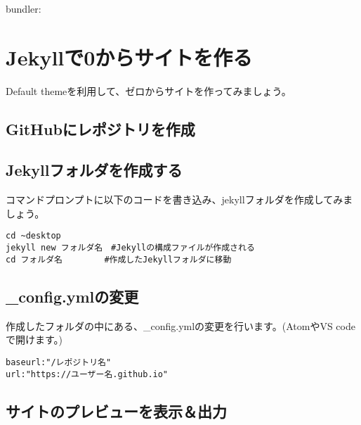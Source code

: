 \documentclass[
]{book}
\begin{document}
bundler:

\hypertarget{jekyllux30670ux304bux3089ux30b5ux30a4ux30c8ux3092ux4f5cux308b}{%
\chapter{Jekyllで0からサイトを作る}\label{jekyllux30670ux304bux3089ux30b5ux30a4ux30c8ux3092ux4f5cux308b}}

Default themeを利用して、ゼロからサイトを作ってみましょう。

\hypertarget{githubux306bux30ecux30ddux30b8ux30c8ux30eaux3092ux4f5cux6210}{%
\section{GitHubにレポジトリを作成}\label{githubux306bux30ecux30ddux30b8ux30c8ux30eaux3092ux4f5cux6210}}

\hypertarget{jekyllux30d5ux30a9ux30ebux30c0ux3092ux4f5cux6210ux3059ux308b}{%
\section{Jekyllフォルダを作成する}\label{jekyllux30d5ux30a9ux30ebux30c0ux3092ux4f5cux6210ux3059ux308b}}

コマンドプロンプトに以下のコードを書き込み、jekyllフォルダを作成してみましょう。

\begin{verbatim}
cd ~desktop
jekyll new フォルダ名　#Jekyllの構成ファイルが作成される
cd フォルダ名　　　　　#作成したJekyllフォルダに移動
\end{verbatim}

\hypertarget{config.ymlux306eux5909ux66f4}{%
\section{\_config.ymlの変更}\label{config.ymlux306eux5909ux66f4}}

作成したフォルダの中にある、\_config.ymlの変更を行います。(AtomやVS codeで開けます。)

\begin{verbatim}
baseurl:"/レポジトリ名"
url:"https://ユーザー名.github.io"
\end{verbatim}

\hypertarget{ux30b5ux30a4ux30c8ux306eux30d7ux30ecux30d3ux30e5ux30fcux3092ux8868ux793aux51faux529b}{%
\section{サイトのプレビューを表示＆出力}\label{ux30b5ux30a4ux30c8ux306eux30d7ux30ecux30d3ux30e5ux30fcux3092ux8868ux793aux51faux529b}}
\end{document}
